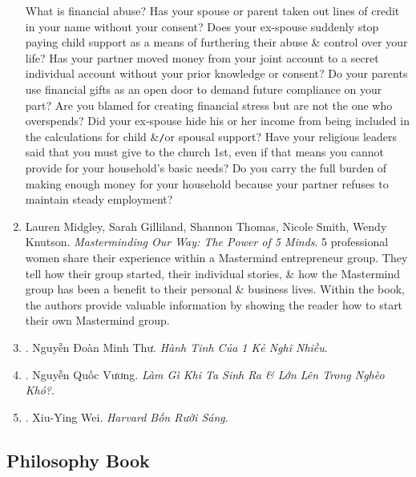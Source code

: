 \documentclass{article}
\begin{document}
\begin{enumerate}
	What is financial abuse? Has your spouse or parent taken out lines of credit in your name without your consent? Does your ex-spouse suddenly stop paying child support as a means of furthering their abuse \& control over your life? Has your partner moved money from your joint account to a secret individual account without your prior knowledge or consent? Do your parents use financial gifts as an open door to demand future compliance on your part? Are you blamed for creating financial stress but are not the one who overspends? Did your ex-spouse hide his or her income from being included in the calculations for child \&{\tt/}or spousal support? Have your religious leaders said that you must give to the church 1st, even if that means you cannot provide for your household's basic needs? Do you carry the full burden of making enough money for your household because your partner refuses to maintain steady employment?
	
	\item {\sc Lauren Midgley, Sarah Gilliland, Shannon Thomas, Nicole Smith, Wendy Knutson}. {\it Masterminding Our Way: The Power of 5 Minds}. 5 professional women share their experience within a Mastermind entrepreneur group. They tell how their group started, their individual stories, \& how the Mastermind group has been a benefit to their personal \& business lives. Within the book, the authors provide valuable information by showing the reader how to start their own Mastermind group. {}
	
	\item \cite{Thu_overthink}. {\sc Nguyễn Đoàn Minh Thư}. {\it Hành Tinh Của 1  Kẻ Nghĩ Nhiều}.\hfill{\sf[done]}
	
	\item \cite{Vuong_born_poor}. {\sc Nguyễn Quốc Vương}. {\it Làm Gì Khi Ta Sinh Ra \& Lớn Lên Trong Nghèo Khó?}.\hfill{\sf[done]}
	
	\item \cite{Wei_Harvard_VN}. {\sc Xiu-Ying Wei}. {\it Harvard Bốn Rưỡi Sáng}.\hfill{\sf[done]}
\end{enumerate}


\subsection{Philosophy Book}
\end{document}
